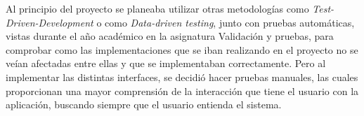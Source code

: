 Al principio del proyecto se planeaba utilizar otras metodologías como \textit{Test-Driven-Development} o como \textit{Data-driven testing}, junto con pruebas automáticas, vistas durante el año académico en la asignatura Validación y pruebas, para comprobar como las implementaciones que se iban realizando en el proyecto no se veían afectadas entre ellas y que se implementaban correctamente. Pero al implementar las distintas interfaces, se decidió hacer pruebas manuales, las cuales proporcionan una mayor comprensión de la interacción que tiene el usuario con la aplicación, buscando siempre que el usuario entienda el sistema.

